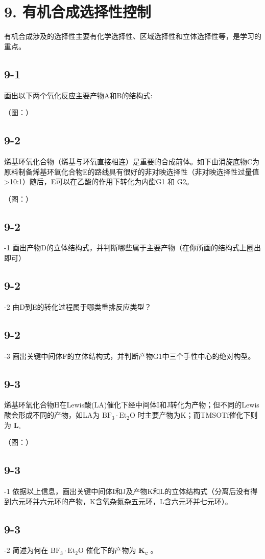 \section*{9. 有机合成选择性控制}
有机合成涉及的选择性主要有化学选择性、区域选择性和⽴体选择性等，是学习的重点。

\subsection*{9-1}
画出以下两个氧化反应主要产物A和B的结构式:

（图：）

\subsection*{9-2}
烯基环氧化合物（烯基与环氧直接相连）是重要的合成前体。如下由消旋底物C为原料制备烯基环氧化合物E的路线具有很好的⾮对映选择性（⾮对映选择性过量值>10:1）随后，E可以在⼄酸的作⽤下转化为内酯G1 和 G2。

（图：）

\subsection*{9-2}
-1 画出产物D的⽴体结构式，并判断哪些属于主要产物（在你所画的结构式上圈出即可）

\subsection*{9-2}
-2 由D到E的转化过程属于哪类重排反应类型？

\subsection*{9-2}
-3 画出关键中间体F的⽴体结构式，并判断产物G1中三个⼿性中⼼的绝对构型。

\subsection*{9-3}
烯基环氧化合物H在Lewis酸(LA)催化下经中间体I和J转化为产物；但不同的Lewis酸会形成不同的产物，如LA为 $\mathrm { B F _ { 3 } { \cdot } E t _ { 2 } O }$ 时主要产物为K；⽽TMSOTf催化下则为 $\mathbf { L } _ { \circ }$

（图：）

\subsection*{9-3}
-1 依据以上信息，画出关键中间体I和J及产物K和L的⽴体结构式（分离后没有得到六元环并六元环的产物，K含氧杂氮杂五元环，L含六元环并七元环）。

\subsection*{9-3}
-2 简述为何在 $\mathrm { B F _ { 3 } { \cdot } E t _ { 2 } O }$ 催化下的产物为 $\mathbf { K } _ { \mathtt { C } }$ 。
